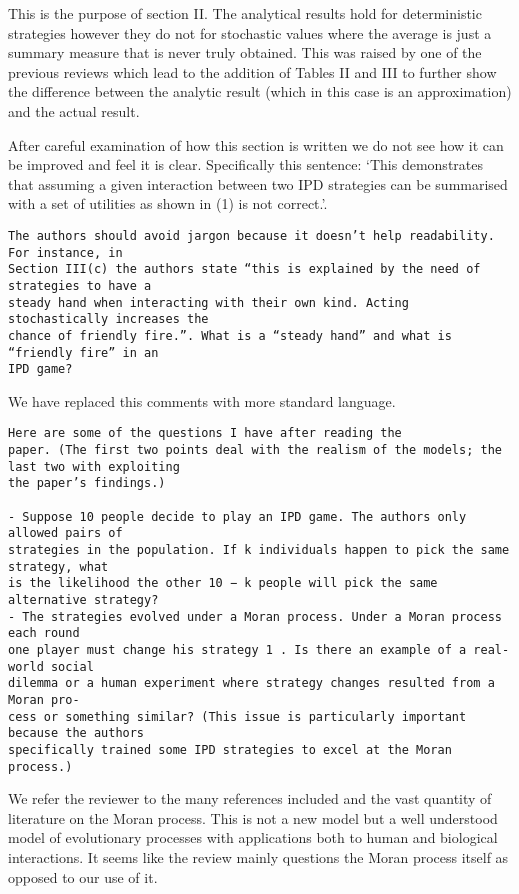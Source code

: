\documentclass[a4]{article}
\begin{document}
This is the purpose of section II. The analytical results hold for deterministic
strategies however they do not for stochastic values where the average is just a
summary measure that is never truly obtained. This was raised by one of the
previous reviews which lead to the addition of Tables II and III to further show
the difference between the analytic result (which in this case is an
approximation) and the actual result.

After careful examination of how this section is written we do not see how it
can be improved and feel it is clear. Specifically this sentence: `This
demonstrates that assuming a given interaction between two
IPD strategies can be summarised with a set of utilities as
shown in (1) is not correct.'.

\begin{verbatim}
The authors should avoid jargon because it doesn’t help readability. For instance, in
Section III(c) the authors state “this is explained by the need of strategies to have a
steady hand when interacting with their own kind. Acting stochastically increases the
chance of friendly fire.”. What is a “steady hand” and what is “friendly fire” in an
IPD game?
\end{verbatim}

We have replaced this comments with more standard language.

\begin{verbatim}
Here are some of the questions I have after reading the
paper. (The first two points deal with the realism of the models; the last two with exploiting
the paper’s findings.)

- Suppose 10 people decide to play an IPD game. The authors only allowed pairs of
strategies in the population. If k individuals happen to pick the same strategy, what
is the likelihood the other 10 − k people will pick the same alternative strategy?
- The strategies evolved under a Moran process. Under a Moran process each round
one player must change his strategy 1 . Is there an example of a real-world social
dilemma or a human experiment where strategy changes resulted from a Moran pro-
cess or something similar? (This issue is particularly important because the authors
specifically trained some IPD strategies to excel at the Moran process.)
\end{verbatim}

We refer the reviewer to the many references included and the vast quantity of
literature on the Moran process. This is not a new model but a well understood
model of evolutionary processes with applications both to human and biological
interactions. It seems like the review mainly questions the Moran process itself
as opposed to our use of it.
\end{document}
